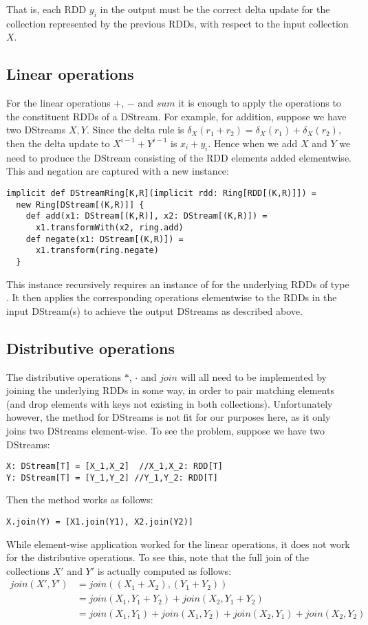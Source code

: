 That is, each RDD $y_i$ in the output must be the correct delta update for the collection represented by the previous RDDs, with respect to the input collection $X$.

\subsection{Linear operations}
For the linear operations $+$, $-$ and $sum$ it is enough to apply the operations to the constituent RDDs of a DStream. For example, for addition, suppose we have two DStreams $X,Y$. Since the delta rule is $\delta_X(r_1 + r_2) = \delta_X(r_1) + \delta_X(r_2)$, then the delta update to $X^{i-1} + Y^{i-1}$ is $x_i + y_i$. Hence when we add $X$ and $Y$ we need to produce the DStream consisting of the RDD elements added elementwise. This and negation are captured with a new  instance:
\vs\begin{lstlisting}
implicit def DStreamRing[K,R](implicit rdd: Ring[RDD[(K,R)]]) =
  new Ring[DStream[(K,R)]] {  
    def add(x1: DStream[(K,R)], x2: DStream[(K,R)]) =
      x1.transformWith(x2, ring.add)
    def negate(x1: DStream[(K,R)]) =
      x1.transform(ring.negate)
  }
\end{lstlisting}\vs
This  instance recursively requires an instance of  for the underlying RDDs of type . It then applies the corresponding operations elementwise to the RDDs in the input DStream(s) to achieve the output DStreams as described above.

\subsection{Distributive operations}
The distributive operations $*$, $\cdot$ and $join$ will all need to be implemented by joining the underlying RDDs in some way, in order to pair matching elements (and drop elements with keys not existing in both collections). Unfortunately however, the  method for DStreams is not fit for our purposes here, as it only joins two DStreams element-wise. To see the problem, suppose we have two DStreams:
\begin{lstlisting}
X: DStream[T] = [X_1,X_2]  //X_1,X_2: RDD[T]
Y: DStream[T] = [Y_1,Y_2] //Y_1,Y_2: RDD[T]
\end{lstlisting}
Then the  method works as follows:
\begin{lstlisting}
X.join(Y) = [X1.join(Y1), X2.join(Y2)]
\end{lstlisting}
While element-wise application worked for the linear operations, it does not work for the distributive operations. To see this, note that the full join of the collections $X'$ and $Y'$ is actually computed as follows:
\begin{equation*}
\begin{split}
join(X',Y') &= join((X_1 + X_2),(Y_1 + Y_2)) \\
&= join(X_1,Y_1 + Y_2) + join(X_2,Y_1 + Y_2) \\
&= join(X_1,Y_1) + join(X_1,Y_2) + join(X_2,Y_1) + join(X_2,Y_2)
\end{split}
\end{equation*}

